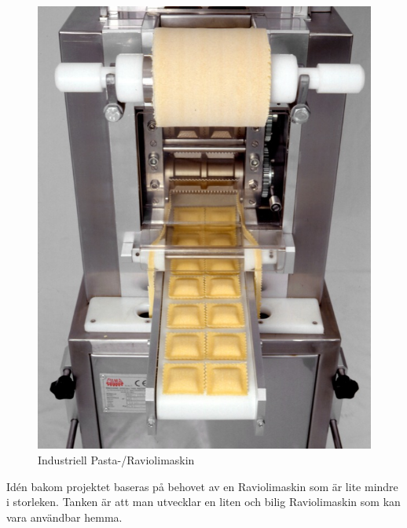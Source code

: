  		\begin{figure}[h]
 			\begin{center}
 				\includegraphics[scale=3]{images/pastamachine.jpg}
 				\caption{Industriell Pasta-/Raviolimaskin}
 				\label{pastamaskin}	
 			\end{center}
 		\end{figure}

Idén bakom projektet baseras på behovet av en Raviolimaskin som är lite mindre i storleken. Tanken är att man utvecklar en liten och bilig Raviolimaskin som kan vara användbar hemma.		